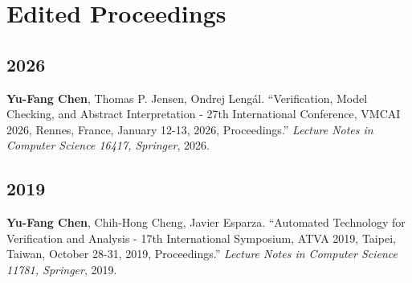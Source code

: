 \documentclass[10.5pt,a4paper]{article}
\begin{document}
\section*{Edited Proceedings}
\subsection*{2026}
\begin{enumerate}[leftmargin=*,label={[\arabic*]},resume]
\item \textbf{Yu-Fang Chen}, Thomas P. Jensen, Ondrej Lengál. ``Verification, Model Checking, and Abstract Interpretation - 27th International Conference, VMCAI 2026, Rennes, France, January 12-13, 2026, Proceedings.'' \emph{Lecture Notes in Computer Science 16417, Springer}, 2026.
\end{enumerate}
\subsection*{2019}
\begin{enumerate}[leftmargin=*,label={[\arabic*]},resume]
\item \textbf{Yu-Fang Chen}, Chih-Hong Cheng, Javier Esparza. ``Automated Technology for Verification and Analysis - 17th International Symposium, ATVA 2019, Taipei, Taiwan, October 28-31, 2019, Proceedings.'' \emph{Lecture Notes in Computer Science 11781, Springer}, 2019.
\end{enumerate}
\end{document}
